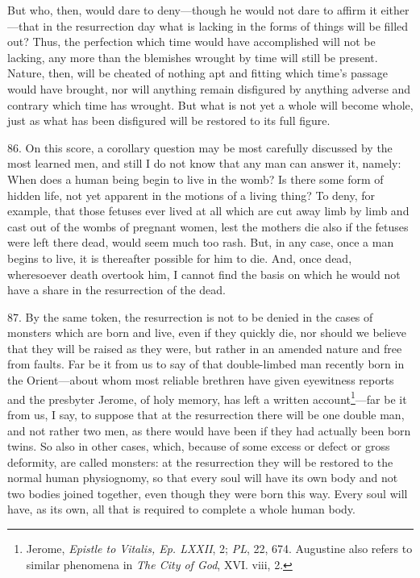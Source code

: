 But who, then, would dare to deny—though he would not dare to affirm it either—that in the resurrection day what is lacking in the forms of things will be filled out? Thus, the perfection which time would have accomplished will not be lacking, any more than the blemishes wrought by time will still be present. Nature, then, will be cheated of nothing apt and fitting which time's passage would have brought, nor will anything remain disfigured by anything adverse and contrary which time has wrought. But what is not yet a whole will become whole, just as what has been disfigured will be restored to its full figure.

86. On this score, a corollary question may be most carefully discussed by the most learned men, and still I do not know that any man can answer it, namely: When does a human being begin to live in the womb? Is there some form of hidden life, not yet apparent in the motions of a living thing? To deny, for example, that those fetuses ever lived at all which are cut away limb by limb and cast out of the wombs of pregnant women, lest the mothers die also if the fetuses were left there dead, would seem much too rash. But, in any case, once a man begins to live, it is thereafter possible for him to die. And, once dead, wheresoever death overtook him, I cannot find the basis on which he would not have a share in the resurrection of the dead.

87. By the same token, the resurrection is not to be denied in the cases of monsters which are born and live, even if they quickly die, nor should we believe that they will be raised as they were, but rather in an amended nature and free from faults. Far be it from us to say of that double-limbed man recently born in the Orient—about whom most reliable brethren have given eyewitness reports and the presbyter Jerome, of holy memory, has left a written account\footnote{Jerome, \emph{Epistle to Vitalis, Ep. LXXII}, 2; \emph{PL}, 22, 674. Augustine also refers to similar phenomena in \emph{The City of God}, XVI. viii, 2.}—far be it from us, I say, to suppose that at the resurrection there will be one double man, and not rather two men, as there would have been if they had actually been born twins. So also in other cases, which, because of some excess or defect or gross deformity, are called monsters: at the resurrection they will be restored to the normal human physiognomy, so that every soul will have its own body and not two bodies joined together, even though they were born this way. Every soul will have, as its own, all that is required to complete a whole human body.

